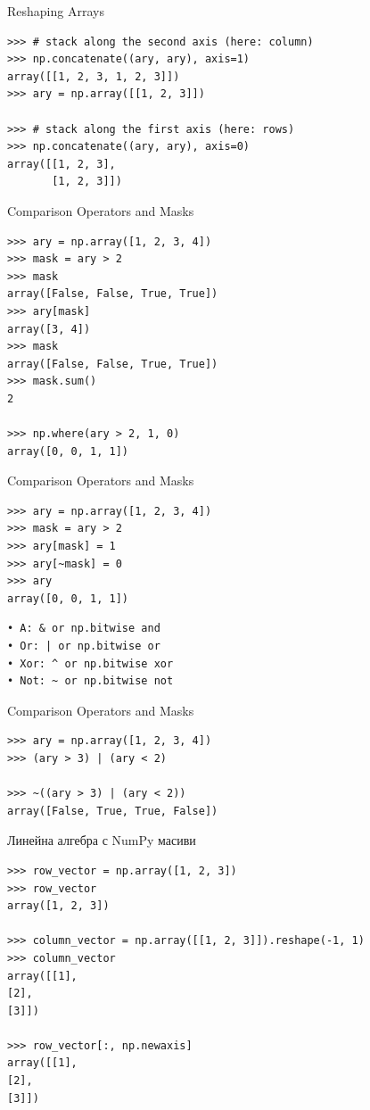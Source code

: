 \documentclass{beamer}
\begin{document}
\begin{frame}[fragile]{Reshaping Arrays}
\begin{verbatim}
>>> # stack along the second axis (here: column)
>>> np.concatenate((ary, ary), axis=1)
array([[1, 2, 3, 1, 2, 3]])
>>> ary = np.array([[1, 2, 3]])

>>> # stack along the first axis (here: rows)
>>> np.concatenate((ary, ary), axis=0)
array([[1, 2, 3],
       [1, 2, 3]])
\end{verbatim}
\end{frame}

\begin{frame}[fragile]{Comparison Operators and Masks}
\begin{verbatim}
>>> ary = np.array([1, 2, 3, 4])
>>> mask = ary > 2
>>> mask
array([False, False, True, True])
>>> ary[mask]
array([3, 4])
>>> mask
array([False, False, True, True])
>>> mask.sum()
2

>>> np.where(ary > 2, 1, 0)
array([0, 0, 1, 1])
\end{verbatim}
\end{frame}

\begin{frame}[fragile]{Comparison Operators and Masks}
\begin{verbatim}
>>> ary = np.array([1, 2, 3, 4])
>>> mask = ary > 2
>>> ary[mask] = 1
>>> ary[~mask] = 0
>>> ary
array([0, 0, 1, 1])
\end{verbatim}


\begin{verbatim}
• A: & or np.bitwise and
• Or: | or np.bitwise or
• Xor: ^ or np.bitwise xor
• Not: ~ or np.bitwise not
\end{verbatim}

\end{frame}

\begin{frame}[fragile]{Comparison Operators and Masks}
\begin{verbatim}
>>> ary = np.array([1, 2, 3, 4])
>>> (ary > 3) | (ary < 2)

>>> ~((ary > 3) | (ary < 2))
array([False, True, True, False])
\end{verbatim}
\end{frame}

\begin{frame}[fragile]{Линейна алгебра с NumPy масиви}
\begin{verbatim}
>>> row_vector = np.array([1, 2, 3])
>>> row_vector
array([1, 2, 3])

>>> column_vector = np.array([[1, 2, 3]]).reshape(-1, 1)
>>> column_vector
array([[1],
[2],
[3]])

>>> row_vector[:, np.newaxis]
array([[1],
[2],
[3]])
\end{verbatim}
\end{frame}
\end{document}
